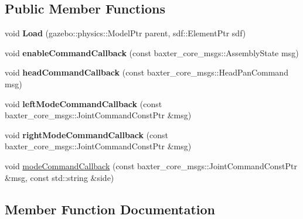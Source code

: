 \subsection*{Public Member Functions}
\begin{DoxyCompactItemize}
\item 
\hypertarget{classbaxter__gazebo__plugin_1_1_baxter_gazebo_ros_control_plugin_ad18708c5af902c198c114c6908c86d66}{}\label{classbaxter__gazebo__plugin_1_1_baxter_gazebo_ros_control_plugin_ad18708c5af902c198c114c6908c86d66} 
void {\bfseries Load} (gazebo\+::physics\+::\+Model\+Ptr parent, sdf\+::\+Element\+Ptr sdf)
\item 
\hypertarget{classbaxter__gazebo__plugin_1_1_baxter_gazebo_ros_control_plugin_ae142ff05eb7ee5d223939b1ecb41731f}{}\label{classbaxter__gazebo__plugin_1_1_baxter_gazebo_ros_control_plugin_ae142ff05eb7ee5d223939b1ecb41731f} 
void {\bfseries enable\+Command\+Callback} (const baxter\+\_\+core\+\_\+msgs\+::\+Assembly\+State msg)
\item 
\hypertarget{classbaxter__gazebo__plugin_1_1_baxter_gazebo_ros_control_plugin_abcbb5c7e3d26eb2dadfd03de5070ba47}{}\label{classbaxter__gazebo__plugin_1_1_baxter_gazebo_ros_control_plugin_abcbb5c7e3d26eb2dadfd03de5070ba47} 
void {\bfseries head\+Command\+Callback} (const baxter\+\_\+core\+\_\+msgs\+::\+Head\+Pan\+Command msg)
\item 
\hypertarget{classbaxter__gazebo__plugin_1_1_baxter_gazebo_ros_control_plugin_aad16fe48445d9dd9b21d3615034e2f37}{}\label{classbaxter__gazebo__plugin_1_1_baxter_gazebo_ros_control_plugin_aad16fe48445d9dd9b21d3615034e2f37} 
void {\bfseries left\+Mode\+Command\+Callback} (const baxter\+\_\+core\+\_\+msgs\+::\+Joint\+Command\+Const\+Ptr \&msg)
\item 
\hypertarget{classbaxter__gazebo__plugin_1_1_baxter_gazebo_ros_control_plugin_a5d21bace211533c2ea269e10ff7f63aa}{}\label{classbaxter__gazebo__plugin_1_1_baxter_gazebo_ros_control_plugin_a5d21bace211533c2ea269e10ff7f63aa} 
void {\bfseries right\+Mode\+Command\+Callback} (const baxter\+\_\+core\+\_\+msgs\+::\+Joint\+Command\+Const\+Ptr \&msg)
\item 
void \hyperlink{classbaxter__gazebo__plugin_1_1_baxter_gazebo_ros_control_plugin_aff0207bdb9a7d00b791ce5edc6ee27b9}{mode\+Command\+Callback} (const baxter\+\_\+core\+\_\+msgs\+::\+Joint\+Command\+Const\+Ptr \&msg, const std\+::string \&side)
\end{DoxyCompactItemize}


\subsection{Member Function Documentation}
\hypertarget{classbaxter__gazebo__plugin_1_1_baxter_gazebo_ros_control_plugin_aff0207bdb9a7d00b791ce5edc6ee27b9}{}\label{classbaxter__gazebo__plugin_1_1_baxter_gazebo_ros_control_plugin_aff0207bdb9a7d00b791ce5edc6ee27b9} 
